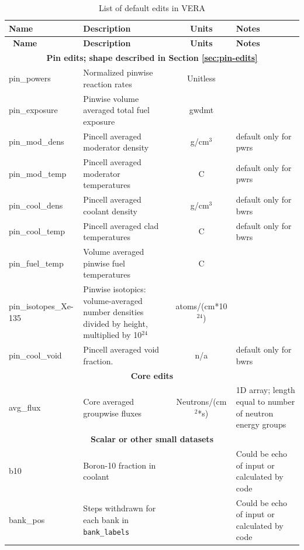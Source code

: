 \begin{longtable}[h]{|l|p{}|c|p{}|}
    \caption{List of default edits in VERA}
    \label{tab:default-state-edits}
    \\

    \hline
    \endfirsthead
    \hline
    {\bf Name} & {\bf Description} & {\bf Units} & {\bf Notes} \\
    \hline
    \endhead
    \hline
    \endfoot
    \hline
    \endlastfoot
    \hline
    \
    {\bf Name} & {\bf Description} & {\bf Units} & {\bf Notes} \\\hline
    \multicolumn{4}{|c|}{\textbf{Pin edits; shape described in Section \ref{sec:pin-edits}}} \\\hline
    pin\_powers &  Normalized pinwise reaction rates & Unitless &  \\\hline
    pin\_exposure & Pinwise volume averaged total fuel exposure & \acrshort{gwdmt} &  \\\hline
    pin\_mod\_dens & Pincell averaged moderator density & g/cm$^3$ & default only for \acp{pwr} \\\hline
    pin\_mod\_temp & Pincell averaged moderator temperatures & C & default only for \acp{pwr} \\\hline
    pin\_cool\_dens & Pincell averaged coolant density & g/cm$^3$ & default only for \acp{bwr} \\\hline
    pin\_cool\_temp & Pincell averaged clad temperatures & C & default only for \acp{bwr} \\\hline
    pin\_fuel\_temp & Volume averaged pinwise fuel temperatures & C &  \\\hline
    pin\_isotopes\_Xe-135 & Pinwise isotopics: volume-averaged number densities divided by height, multiplied by 10$^{24}$ & atoms/(cm*10$^{24}$) &  \\\hline
    pin\_cool\_void & Pincell averaged void fraction. & n/a & default only for \acp{bwr} \\\hline\hline
    \multicolumn{4}{|c|}{\textbf{Core edits}} \\\hline
    avg\_flux & Core averaged groupwise fluxes & Neutrons/(cm$^2$*s) & 1D array; length equal to number of neutron energy groups \\\hline\hline
    \multicolumn{4}{|c|}{\textbf{Scalar or other small datasets}} \\\hline
b10 & Boron-10 fraction in coolant &  & Could be echo of input or calculated by code \\\hline
bank\_pos & Steps withdrawn for each bank in \texttt{bank\_labels} &  & Could be echo of input or calculated by code \\\hline

\end{longtable}
